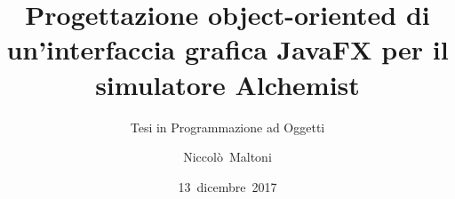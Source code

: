 \documentclass[%
]{beamer}
\title{%
    Progettazione object-oriented di un'interfaccia grafica %
    JavaFX per il simulatore Alchemist
}
\subtitle{Tesi in Programmazione ad Oggetti}
\author[vlr]{Niccolò~Maltoni}
\date{13~dicembre~2017}
\institute[Unibo]{%
     Alma Mater Studiorum - Università di Bologna \\%
     Campus di Cesena%
}
\begin{document}
    \begin{frame}
        \titlepage
    \end{frame}



\end{document}
